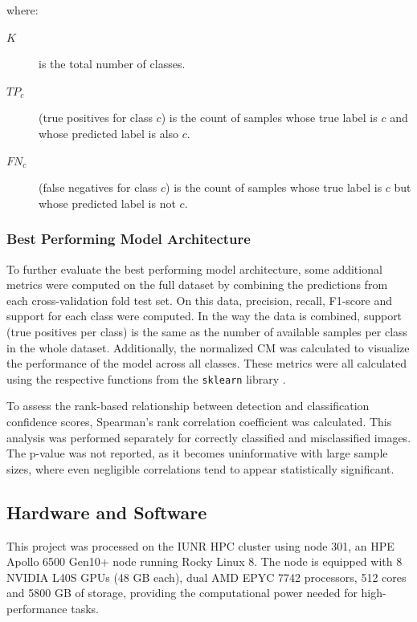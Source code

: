     \noindent where:
    \begin{description}
        \item[\(K\)] is the total number of classes.
        \item[\(TP_{c}\)] (true positives for class \(c\)) is the count of samples whose true label is \(c\) and whose predicted label is also \(c\).
        \item[\(FN_{c}\)] (false negatives for class \(c\)) is the count of samples whose true label is \(c\) but whose predicted label is not \(c\).
    \end{description}

    \subsubsection{Best Performing Model Architecture}
    To further evaluate the best performing model architecture, some additional metrics were computed on the full dataset by combining the predictions from each cross-validation fold test set.
    On this data, precision, recall, F1-score and support for each class were computed.
    In the way the data is combined, support (true positives per class) is the same as the number of available samples per class in the whole dataset.
    Additionally, the normalized \ac{CM} was calculated to visualize the performance of the model across all classes.
    These metrics were all calculated using the respective functions from the \texttt{sklearn} library \autocite{pedregosaScikitlearnMachineLearning2011}.

    To assess the rank-based relationship between detection and classification confidence scores, Spearman's rank correlation coefficient was calculated.
    This analysis was performed separately for correctly classified and misclassified images.
    The p-value was not reported, as it becomes uninformative with large sample sizes, where even negligible correlations tend to appear statistically significant.

    \subsection{Hardware and Software}
    This project was processed on the \ac{IUNR} \ac{HPC} cluster using node 301, an HPE Apollo 6500 Gen10+ node running Rocky Linux 8.
    The node is equipped with 8 NVIDIA L40S \acp{GPU} (48 \ac{GB} each), dual AMD EPYC 7742 processors, 512 cores and 5800 \ac{GB} of storage, providing the computational power needed for high-performance tasks.

